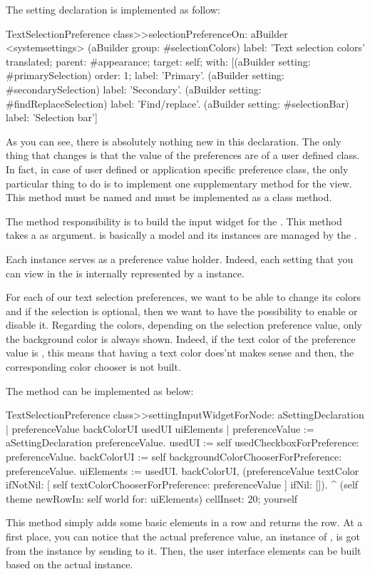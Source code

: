 \documentclass[a4paper,10pt,twoside]{book}
\begin{document}
{The setting declaration is implemented as follow:
\begin{code}{}
TextSelectionPreference class>>selectionPreferenceOn: aBuilder 
	<systemsettings>
	(aBuilder group: #selectionColors) 
		label: 'Text selection colors' translated;
		parent: #appearance;
		target: self;
		with: [(aBuilder setting: #primarySelection) order: 1;
				 label: 'Primary'.
			(aBuilder setting: #secondarySelection)
				label: 'Secondary'.
			(aBuilder setting: #findReplaceSelection)
				label: 'Find/replace'.
			(aBuilder setting: #selectionBar)
				label: 'Selection bar']
\end{code}
As you can see, there is absolutely nothing new in this declaration. The only thing that changes is that the value of the preferences are of a user defined class. In fact, in case of user defined or application specific preference class, the only particular thing to do is to implement one supplementary method for the view. This method must be named  and must be implemented as a class method.

The method  responsibility is to build the input widget for the \setbrowser. This method takes a  as argument.  is basically a model and its instances are managed by the \setbrowser. 

Each  instance serves as a preference value holder. Indeed, each setting that you can view in the \setbrowser is internally represented by a  instance. 

For each of our text selection preferences, we want to be able to change its colors and if the selection is optional, then we want to have the possibility to enable or disable it. Regarding the colors, depending on the selection preference value, only the background color is always shown. Indeed, if the text color of the preference value is , this means that having a text color does'nt makes sense and then, the corresponding color chooser is not built. 

The  method can be implemented as below:
\begin{code}{}
TextSelectionPreference class>>settingInputWidgetForNode: aSettingDeclaration 
	| preferenceValue backColorUI usedUI uiElements |
	preferenceValue := aSettingDeclaration preferenceValue.
	usedUI := self usedCheckboxForPreference: preferenceValue.
	backColorUI := self backgroundColorChooserForPreference: preferenceValue.
	uiElements := {usedUI. backColorUI}, 
		(preferenceValue textColor 
			ifNotNil: [ { self textColorChooserForPreference: preferenceValue } ] 
			ifNil: [{}]).
	^ (self theme newRowIn: self world for: uiElements) 
		 cellInset: 20;
		 yourself 
\end{code}
This method simply adds some basic elements in a row and returns the row. At a first place, you can notice that the actual preference value, an instance of , is got from the  instance by sending  to it. Then, the user interface elements can be built based on the actual  instance.

}
\end{document}
